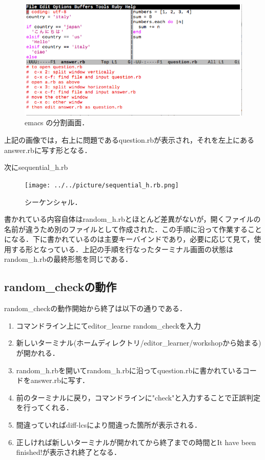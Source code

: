 \documentclass[11pt,dvipdfmx]{jsarticle}
\providecommand{\tightlist}{%
      \setlength{\itemsep}{0pt}\setlength{\parskip}{0pt}}
\begin{document}
\begin{figure}[H]
\centering
\begin{center}
\includegraphics[width=150mm]{../../picture/split.png}
\end{center}
\caption{emacs の分割画面．\label{split}}

\label{fig:}
\end{figure}

上記の画像では，右上に問題であるquestion.rbが表示され，それを左上にあるanswer.rbに写す形となる．

次にsequential\_h.rb

\begin{figure}[H]
\centering
\begin{center}
\texttt{[image: ../../picture/sequential\_h.rb.png]}
\end{center}
\caption{シーケンシャル．\label{sqquential}}

\label{fig:}
\end{figure}

書かれている内容自体はrandom\_h.rbとほとんど差異がないが，開くファイルの名前が違うため別のファイルとして作成された．この手順に沿って作業することになる．下に書かれているのは主要キーバインドであり，必要に応じて見て，使用する形となっている．上記の手順を行なったターミナル画面の状態はrandom\_h.rbの最終形態を同じである．

    \subsection{random\_checkの動作}\label{random_checkux306eux52d5ux4f5c}

random\_checkの動作開始から終了は以下の通りである．

\begin{enumerate}
\def\labelenumi{\arabic{enumi}.}
\tightlist
\item
  コマンドライン上にてeditor\_learne random\_checkを入力
\item
  新しいターミナル(ホームディレクトリ/editor\_learner/workshopから始まる)が開かれる．
\item
  random\_h.rbを開いてrandom\_h.rbに沿ってquestion.rbに書かれているコードをanswer.rbに写す．
\item
  前のターミナルに戻り，コマンドラインに"check"と入力することで正誤判定を行ってくれる．
\item
  間違っていればdiff-lcsにより間違った箇所が表示される．
\item
  正しければ新しいターミナルが開かれてから終了までの時間とIt have been
  finished!が表示され終了となる．
\end{enumerate}
\end{document}
